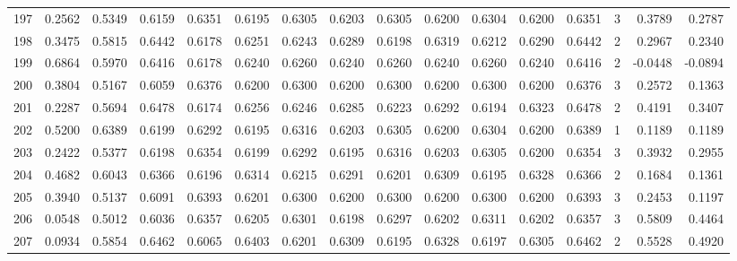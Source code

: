 \begin{tabular}{lrrrrrrrrrrrrrrr}
197 &      0.2562 &  0.5349 &  0.6159 &  0.6351 &  0.6195 &  0.6305 &  0.6203 &  0.6305 &  0.6200 &  0.6304 &   0.6200 &     0.6351 &      3 &                    0.3789 &                     0.2787 \\
198 &      0.3475 &  0.5815 &  0.6442 &  0.6178 &  0.6251 &  0.6243 &  0.6289 &  0.6198 &  0.6319 &  0.6212 &   0.6290 &     0.6442 &      2 &                    0.2967 &                     0.2340 \\
199 &      0.6864 &  0.5970 &  0.6416 &  0.6178 &  0.6240 &  0.6260 &  0.6240 &  0.6260 &  0.6240 &  0.6260 &   0.6240 &     0.6416 &      2 &                   -0.0448 &                    -0.0894 \\
200 &      0.3804 &  0.5167 &  0.6059 &  0.6376 &  0.6200 &  0.6300 &  0.6200 &  0.6300 &  0.6200 &  0.6300 &   0.6200 &     0.6376 &      3 &                    0.2572 &                     0.1363 \\
201 &      0.2287 &  0.5694 &  0.6478 &  0.6174 &  0.6256 &  0.6246 &  0.6285 &  0.6223 &  0.6292 &  0.6194 &   0.6323 &     0.6478 &      2 &                    0.4191 &                     0.3407 \\
202 &      0.5200 &  0.6389 &  0.6199 &  0.6292 &  0.6195 &  0.6316 &  0.6203 &  0.6305 &  0.6200 &  0.6304 &   0.6200 &     0.6389 &      1 &                    0.1189 &                     0.1189 \\
203 &      0.2422 &  0.5377 &  0.6198 &  0.6354 &  0.6199 &  0.6292 &  0.6195 &  0.6316 &  0.6203 &  0.6305 &   0.6200 &     0.6354 &      3 &                    0.3932 &                     0.2955 \\
204 &      0.4682 &  0.6043 &  0.6366 &  0.6196 &  0.6314 &  0.6215 &  0.6291 &  0.6201 &  0.6309 &  0.6195 &   0.6328 &     0.6366 &      2 &                    0.1684 &                     0.1361 \\
205 &      0.3940 &  0.5137 &  0.6091 &  0.6393 &  0.6201 &  0.6300 &  0.6200 &  0.6300 &  0.6200 &  0.6300 &   0.6200 &     0.6393 &      3 &                    0.2453 &                     0.1197 \\
206 &      0.0548 &  0.5012 &  0.6036 &  0.6357 &  0.6205 &  0.6301 &  0.6198 &  0.6297 &  0.6202 &  0.6311 &   0.6202 &     0.6357 &      3 &                    0.5809 &                     0.4464 \\
207 &      0.0934 &  0.5854 &  0.6462 &  0.6065 &  0.6403 &  0.6201 &  0.6309 &  0.6195 &  0.6328 &  0.6197 &   0.6305 &     0.6462 &      2 &                    0.5528 &                     0.4920 \\

\end{tabular}
